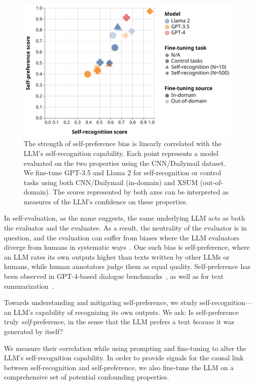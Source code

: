 \documentclass{article}
\theoremstyle{plain}
\theoremstyle{definition}
\theoremstyle{remark}
\begin{document}
\begin{figure}[H] \centering
\includegraphics[width=\columnwidth]{images/main_cnn_correlation.pdf}
\caption{The strength of self-preference bias is linearly correlated with the LLM's self-recognition capability. Each point represents a model evaluated on the two properties using the CNN/Dailymail dataset. We fine-tune GPT-3.5 and Llama 2 for self-recognition or control tasks using both CNN/Dailymail (in-domain) and XSUM (out-of-domain). The scores represented by both axes can be interpreted as measures of the LLM's confidence on these properties.}
\label{fig:scaling_law_plot}
\end{figure}

In self-evaluation, as the name suggests, the same underlying LLM acts as both the evaluator and the evaluatee.
As a result, the neutrality of the evaluator is in question, and the evaluation can suffer from biases where the LLM evaluators diverge from humans in systematic ways~\citep{zheng2024judging,bai2024benchmarking}.
One such bias is self-preference, where an LLM rates its own outputs higher than texts written by other LLMs or humans, while human annotators judge them as equal quality.
Self-preference has been observed in GPT-4-based dialogue benchmarks~\citep{bittonVisITBenchBenchmarkVisionLanguage2023a, koo2023benchmarking}, as well as for text summarization~\citep{liuLLMsNarcissisticEvaluators2023}.

Towards understanding and mitigating self-preference, we study self-recognition---an LLM's capability of recognizing its own outputs.
We ask: Is self-preference truly \textit{self}-preference, in the sense that the LLM prefers a text \textit{because} it was generated by itself?

We measure their correlation while using prompting and fine-tuning to alter the LLM's self-recognition capability.
In order to provide signals for the causal link between self-recognition and self-preference, we also fine-tune the LLM on a comprehensive set of potential confounding properties.
\end{document}
